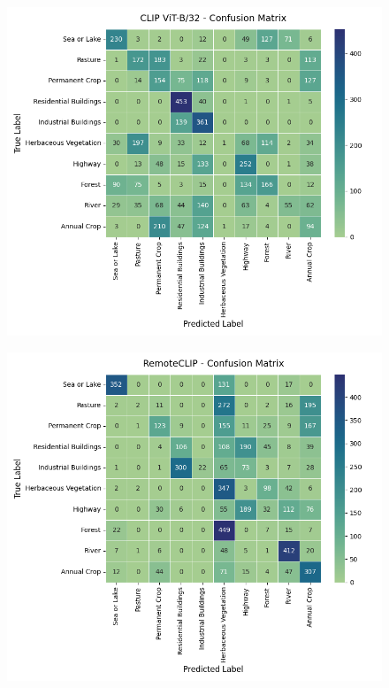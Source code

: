 \documentclass[a4paper, oneside, english]{sapthesis} %
\begin{document}
\vspace{0.5cm}

\noindent
\begin{minipage}{\textwidth}
    \centering

    \begin{subfigure}[t]{0.48\textwidth}
      \centering
      \includegraphics[width=\linewidth]{img/EuroSAT_CLIP_32_cm.png}
    \end{subfigure}
    \hfill
    \begin{subfigure}[t]{0.48\textwidth}
      \centering
      \includegraphics[width=\linewidth]{img/EuroSAT_RemoteCLIP_32_cm.png}
    \end{subfigure}


\end{minipage}
\end{document}
